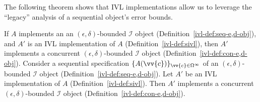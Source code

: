 The following theorem shows
that IVL implementations allow us to leverage the
``legacy'' analysis of a sequential object's error bounds.
\begin{theorem}
    If $A$ implements an an $(\epsilon,\delta)$-bounded $\mathcal{I}$ object (Definition~\ref{ivl-def:seq-e,d-obj}),
    and $A'$ is an IVL implementation of $A$ (Definition~\ref{ivl-def:sivl}), then $A'$ implements
    a concurrent $(\epsilon,\delta)$-bounded $\mathcal{I}$ object (Definition~\ref{ivl-def:con-e,d-obj}).
    Consider a sequential specification $\{A(\vv{c})\}_{\vv{c} \in \Omega^\infty}$ of an $(\epsilon,\delta)$-bounded
    $\mathcal{I}$ object (Definition~\ref{ivl-def:seq-e,d-obj}). Let $A'$ be an IVL implementation of $A$ (Definition~\ref{ivl-def:sivl}). Then $A'$ implements a concurrent
    $(\epsilon,\delta)$-bounded $\mathcal{I}$ object (Definition~\ref{ivl-def:con-e,d-obj}).
    \label{ivl-thm:SIVL-bound}
\end{theorem}
